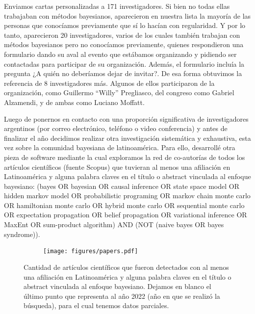 \documentclass[a4paper,11pt]{book}
\theoremstyle{definition}
\begin{document}

Enviamos cartas personalizadas a 171 investigadores.
%
Si bien no todas ellas trabajaban con métodos bayesianos, aparecieron en nuestra lista la mayoría de las personas que conocíamos previamente que sí lo hacían con regularidad.
%
Y por lo tanto, aparecieron 20 investigadores, varios de los cuales también trabajan con métodos bayesianos pero no conocíamos previamente, quienes respondieron una formulario dando su aval al evento que estábamos organizando y pidiendo ser contactadas para participar de su organización.
%
Además, el formulario incluía la pregunta ¿A quién no deberíamos dejar de invitar?.
%
De esa forma obtuvimos la referencia de 8 investigadores más.
%
Algunos de ellos participaron de la organización, como Guillermo ``Willy'' Pregliasco, del congreso como Gabriel Alzamendi, y de ambas como Luciano Moffatt.


Luego de ponernos en contacto con una proporción significativa de investigadores argentinos (por correo electrónico, teléfono o video conferencia) y antes de finalizar el año decidimos realizar otra investigación sistemática y exhaustiva, esta vez sobre la comunidad bayesiana de latinoamérica.
%
Para ello, desarrollé otra pieza de software mediante la cual exploramos la red de co-autorías de todos los artículos científicos (fuente Scopus) que tuvieran al menos una afiliación en Latinoamérica y alguna palabra claves en el título o abstract vinculada al enfoque bayesiano: (bayes OR bayesian OR causal inference OR state space model OR hidden markov model OR probabilistic programing OR markov chain monte carlo OR hamiltonian monte carlo OR hybrid monte carlo OR sequential monte carlo OR expectation propagation OR belief propagation OR variational inference OR MaxEnt OR sum-product algorithm) AND (NOT (naive bayes OR bayes syndrome)).


\begin{figure}[ht!]
\centering
  \begin{subfigure}[b]{0.60\textwidth}
  \texttt{[image: figures/papers.pdf]}
  \end{subfigure}
  \caption{Cantidad de artículos científicos que fueron detectados con al menos una afiliación en Latinoamérica y alguna palabra claves en el título o abstract vinculada al enfoque bayesiano. Dejamos en blanco el último punto que representa al año 2022 (año en que se realizó la búsqueda), para el cual tenemos datos parciales.}
\end{figure}
\end{document}

